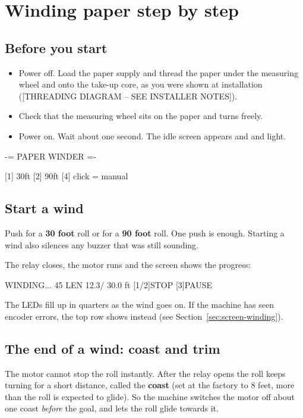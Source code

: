 \chapter{Winding paper step by step}\label{ch:winding}

\section{Before you start}
\begin{itemize}
  \item Power off. Load the paper supply and thread the paper under the
        measuring wheel and onto the take-up core, as you were shown at
        installation ([THREADING DIAGRAM -- SEE INSTALLER NOTES]).
  \item Check that the measuring wheel sits on the paper and turns freely.
  \item Power on. Wait about one second. The idle screen appears and
         and  light.
\end{itemize}

\begin{lcd}
 -= PAPER WINDER =-

[1] 30ft    [2] 90ft
[4] click = manual
\end{lcd}

\section{Start a wind}
Push  for a \textbf{30 foot} roll or  for a \textbf{90 foot}
roll. One push is enough. Starting a wind also silences any buzzer that was
still sounding.

The relay closes, the motor runs and the screen shows the progress:

\begin{lcd}
     WINDING...
 45%
LEN   12.3/  30.0 ft
[1/2]STOP   [3]PAUSE
\end{lcd}

The LEDs fill up in quarters as the wind goes on. If the machine has seen
encoder errors, the top row shows  instead (see
Section~\ref{sec:screen-winding}).

\section{The end of a wind: coast and trim}\label{sec:trim}
The motor cannot stop the roll instantly. After the relay opens the roll
keeps turning for a short distance, called the \textbf{coast} (set at the
factory to 8 feet, more than the roll is expected to glide). So the machine
switches the motor off about one coast \emph{before} the goal, and lets the
roll glide towards it.

